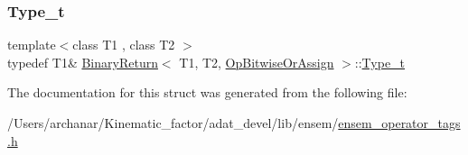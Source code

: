 \mbox{\label{structBinaryReturn_3_01T1_00_01T2_00_01OpBitwiseOrAssign_01_4_a256f1f50cdbaf032fbed109888ad5bfc}} 
\subsubsection{\texorpdfstring{Type\_t}{Type\_t}\hspace{0.1cm}{\footnotesize\ttfamily [2/2]}}
{\footnotesize\ttfamily template$<$class T1 , class T2 $>$ \\
typedef T1\& \mbox{\hyperlink{structBinaryReturn}{Binary\+Return}}$<$ T1, T2, \mbox{\hyperlink{structOpBitwiseOrAssign}{Op\+Bitwise\+Or\+Assign}} $>$\+::\mbox{\hyperlink{structBinaryReturn_3_01T1_00_01T2_00_01OpBitwiseOrAssign_01_4_a256f1f50cdbaf032fbed109888ad5bfc}{Type\+\_\+t}}}



The documentation for this struct was generated from the following file\+:\begin{DoxyCompactItemize}
\item 
/\+Users/archanar/\+Kinematic\+\_\+factor/adat\+\_\+devel/lib/ensem/\mbox{\hyperlink{lib_2ensem_2ensem__operator__tags_8h}{ensem\+\_\+operator\+\_\+tags.\+h}}\end{DoxyCompactItemize}
